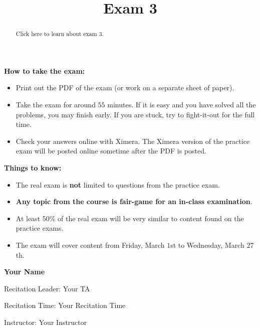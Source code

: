 \documentclass{ximera}
\title{Exam 3}
\begin{document}
\begin{abstract}
Click here to learn about exam 3.
\end{abstract}
\maketitle

\thispagestyle{empty}


\vfill

\textbf{How to take the exam:}
\begin{itemize}
  \item Print out the PDF of the exam (or work on a separate sheet of paper).
  \item Take the exam for around $55$ minutes. If it is easy and you
    have solved all the problems, you may finish early. If you are
    stuck, try to fight-it-out for the full time.
  \item Check your answers online with Ximera. The Ximera version of
    the practice exam will be posted online sometime after the PDF is
    posted.
\end{itemize}

\textbf{Things to know:}
\begin{itemize}
\item The real exam is \textbf{not} limited to questions from the practice
  exam.
\item \textbf{Any topic from the course is fair-game for an in-class
  examination}.
\item At least 50\% of the real exam will be very similar to content
  found on the practice exams.
\item The exam will cover content from Friday, March $1$st to
  Wednesday, March $27$th.
\end{itemize}

\noindent\textsf{{\fontsize{32}{36}\textbf{Your Name}}} 

\vspace{1cm}

\noindent\textsf{\large Recitation Leader: Your TA} 


\noindent\textsf{\large Recitation Time: Your Recitation Time} 


\noindent\textsf{\large Instructor: Your Instructor}


\end{document}
